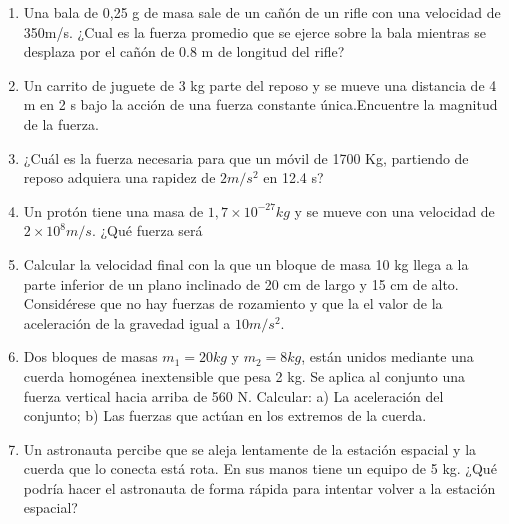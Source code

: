 \begin{enumerate}
\item Una bala de 0,25 g de masa sale de un cañón de un rifle con una velocidad de 350m/s. ¿Cual es la fuerza promedio que se 
ejerce sobre la bala mientras se desplaza por el cañón de 0.8 m de longitud del rifle?

\item Un carrito de juguete de 3 kg parte del reposo y se mueve una distancia de 4 m en 2 s bajo la acción de una fuerza 
constante 
única.Encuentre la magnitud de la fuerza. 

\item ¿Cuál es la fuerza necesaria para que un móvil de 1700 Kg, partiendo de reposo adquiera una rapidez de $2 m/s^2$ en 12.4 s?

\item Un protón tiene una masa de $1,7 \times 10^{-27} kg$ y se mueve con una velocidad de $2 \times 10^{8} m/s$. ¿Qué fuerza será 

\item Calcular la velocidad final con la que un bloque de masa 10 kg llega a la parte inferior de un plano inclinado de 20 cm 
de largo y 15 cm de alto. Considérese que no hay fuerzas de rozamiento y que la el valor de la aceleración de la gravedad igual a $10 m/s^2$.

\item Dos bloques de masas $m_1 = 20 kg$ y $m_2 = 8 kg$, están unidos mediante una cuerda homogénea inextensible que pesa 2 kg. Se
aplica al conjunto una fuerza vertical hacia arriba de 560 N. Calcular: a) La aceleración del conjunto; b) Las fuerzas que actúan 
en los extremos de la cuerda.

\item Un astronauta percibe que se aleja lentamente de la estación espacial y la cuerda que lo conecta está rota. En sus manos 
tiene un equipo de 5 kg. ¿Qué podría hacer el astronauta de forma rápida para intentar volver a la estación espacial?     

\end{enumerate}
